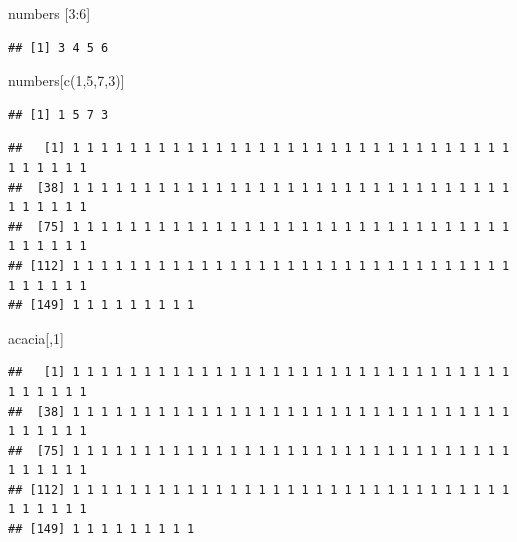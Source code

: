 \documentclass[
]{article}
\newenvironment{Shaded}{\begin{snugshade}}{\end{snugshade}}
\newcommand{\DecValTok}[1]{\textcolor[rgb]{0.00,0.00,0.81}{#1}}
\newcommand{\FunctionTok}[1]{\textcolor[rgb]{0.00,0.00,0.00}{#1}}
\newcommand{\NormalTok}[1]{#1}
\newcommand{\SpecialCharTok}[1]{\textcolor[rgb]{0.00,0.00,0.00}{#1}}
\begin{document}
\begin{Shaded}
\begin{Highlighting}[]
\NormalTok{numbers [}\DecValTok{3}\SpecialCharTok{:}\DecValTok{6}\NormalTok{]}
\end{Highlighting}
\end{Shaded}

\begin{verbatim}
## [1] 3 4 5 6
\end{verbatim}

\begin{Shaded}
\begin{Highlighting}[]
\NormalTok{numbers[}\FunctionTok{c}\NormalTok{(}\DecValTok{1}\NormalTok{,}\DecValTok{5}\NormalTok{,}\DecValTok{7}\NormalTok{,}\DecValTok{3}\NormalTok{)]}
\end{Highlighting}
\end{Shaded}

\begin{verbatim}
## [1] 1 5 7 3
\end{verbatim}

\begin{Shaded}
\end{Shaded}

\begin{verbatim}
##   [1] 1 1 1 1 1 1 1 1 1 1 1 1 1 1 1 1 1 1 1 1 1 1 1 1 1 1 1 1 1 1 1 1 1 1 1 1 1
##  [38] 1 1 1 1 1 1 1 1 1 1 1 1 1 1 1 1 1 1 1 1 1 1 1 1 1 1 1 1 1 1 1 1 1 1 1 1 1
##  [75] 1 1 1 1 1 1 1 1 1 1 1 1 1 1 1 1 1 1 1 1 1 1 1 1 1 1 1 1 1 1 1 1 1 1 1 1 1
## [112] 1 1 1 1 1 1 1 1 1 1 1 1 1 1 1 1 1 1 1 1 1 1 1 1 1 1 1 1 1 1 1 1 1 1 1 1 1
## [149] 1 1 1 1 1 1 1 1 1
\end{verbatim}

\begin{Shaded}
\begin{Highlighting}[]
\NormalTok{acacia[,}\DecValTok{1}\NormalTok{]}
\end{Highlighting}
\end{Shaded}

\begin{verbatim}
##   [1] 1 1 1 1 1 1 1 1 1 1 1 1 1 1 1 1 1 1 1 1 1 1 1 1 1 1 1 1 1 1 1 1 1 1 1 1 1
##  [38] 1 1 1 1 1 1 1 1 1 1 1 1 1 1 1 1 1 1 1 1 1 1 1 1 1 1 1 1 1 1 1 1 1 1 1 1 1
##  [75] 1 1 1 1 1 1 1 1 1 1 1 1 1 1 1 1 1 1 1 1 1 1 1 1 1 1 1 1 1 1 1 1 1 1 1 1 1
## [112] 1 1 1 1 1 1 1 1 1 1 1 1 1 1 1 1 1 1 1 1 1 1 1 1 1 1 1 1 1 1 1 1 1 1 1 1 1
## [149] 1 1 1 1 1 1 1 1 1
\end{verbatim}
\end{document}
